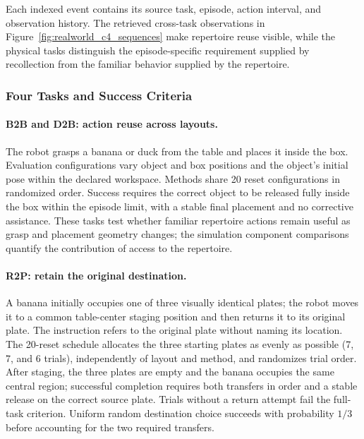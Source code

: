 Each indexed event contains its source task, episode, action interval, and observation history.
The retrieved cross-task observations in Figure~\ref{fig:realworld_c4_sequences} make repertoire reuse visible, while the physical tasks distinguish the episode-specific requirement supplied by recollection from the familiar behavior supplied by the repertoire.

\subsubsection{Four Tasks and Success Criteria}
\label{app:realworld_tasks}

\paragraph{B2B and D2B: action reuse across layouts.}
The robot grasps a banana or duck from the table and places it inside the box.
Evaluation configurations vary object and box positions and the object's initial pose within the declared workspace.
Methods share 20 reset configurations in randomized order.
Success requires the correct object to be released fully inside the box within the episode limit, with a stable final placement and no corrective assistance.
These tasks test whether familiar repertoire actions remain useful as grasp and placement geometry changes; the simulation component comparisons quantify the contribution of access to the repertoire.

\paragraph{R2P: retain the original destination.}
A banana initially occupies one of three visually identical plates; the robot moves it to a common table-center staging position and then returns it to its original plate.
The instruction refers to the original plate without naming its location.
The 20-reset schedule allocates the three starting plates as evenly as possible (7, 7, and 6 trials), independently of layout and method, and randomizes trial order.
After staging, the three plates are empty and the banana occupies the same central region; successful completion requires both transfers in order and a stable release on the correct source plate.
Trials without a return attempt fail the full-task criterion.
Uniform random destination choice succeeds with probability $1/3$ before accounting for the two required transfers.


